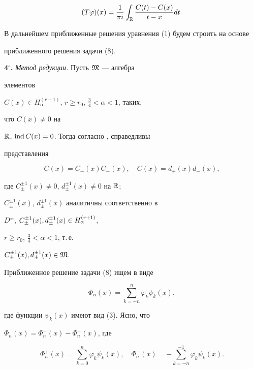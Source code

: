 $$ 


(T\varphi)(x)=\frac{1}{\pi i}\int_{\Bbb R} 


\frac{C(t)-C(x)}{t-x}dt. 


$$ 


 


В дальнейшем приближенные решения уравнения (1) будем строить на основе 


приближенного решения задачи (8). 


\medskip 


 


{\bf 4${}^\circ$.} {\it Метод редукции.} Пусть $\frak M$ --- алгебра 


элементов 


$C(x)\in H^{(r+1)}_\alpha$, $r\ge r_0$, $\frac{3}{4}<\alpha<1$, таких, 


что $C(x)\ne 0$ на 


$\Bbb R$, $\operatorname{ind} C(x)=0$. Тогда согласно \cite{6}, \cite{8} справедливы 


представления 


$$ 


C(x)=C_+(x)C_-(x),\quad C(x)=d_+(x)d_-(x), 


$$ 


где $C^{\pm 1}_\pm(x)\ne 0$, $d^{\pm 1}_\pm(x)\ne 0$ на $\Bbb R$; 


$C^{\pm 1}_\pm(x)$, $d^{\pm 1}_\pm(x)$ аналитичны соответственно в 


$D^\pm$, $C^{\pm 1}_\pm(x),\linebreak d^{\pm 1}_\pm(x)\in H^{(r+1)}_\alpha$, 


$r\ge r_0$, $\frac{3}{4}<\alpha< 1$, т.\,е. 


$C^{\pm 1}_\pm(x),d^{\pm 1}_\pm(x)\in\frak M$. 


 


Приближенное решение задачи (8) ищем в виде 


\begin{equation} 


\Phi_n(x)=\sum^n_{k=-n}\varphi_k\psi_k(x), 


\end{equation} 


где функции $\psi_k(x)$ имеют вид (3). Ясно, что 


$\Phi_n(x)=\Phi^+_n(x)-\Phi^-_n(x)$, где 


\begin{equation} 


\Phi^+_n(x)=\sum^n_{k=0}\varphi_k\psi_k(x),\quad 


\Phi^-_n(x)=-\sum^{-1}_{k=-n}\varphi_k\psi_k(x). 


\end{equation} 


